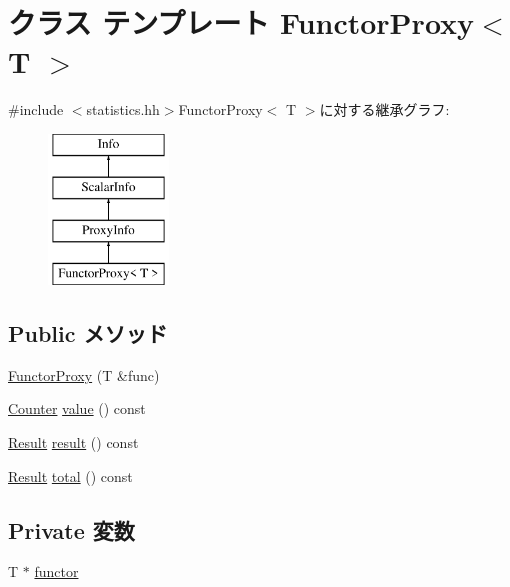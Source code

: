 \hypertarget{classStats_1_1FunctorProxy}{
\section{クラス テンプレート FunctorProxy$<$ T $>$}
\label{classStats_1_1FunctorProxy}
}


{\ttfamily \#include $<$statistics.hh$>$}FunctorProxy$<$ T $>$に対する継承グラフ:\begin{figure}[H]
\begin{center}
\leavevmode
\includegraphics[height=4cm]{classStats_1_1FunctorProxy}
\end{center}
\end{figure}
\subsection*{Public メソッド}
\begin{DoxyCompactItemize}
\item 
\hyperlink{classStats_1_1FunctorProxy_a97d355488c67286f64a92cf2cfacabc2}{FunctorProxy} (T \&func)
\item 
\hyperlink{namespaceStats_ac35128c026c72bb36af9cea00774e8a6}{Counter} \hyperlink{classStats_1_1FunctorProxy_aa9e486cb7eb0ad44f5f89923594b68a4}{value} () const 
\item 
\hyperlink{namespaceStats_ad874d2cfd4b4a29ebd480bb2e67f20ae}{Result} \hyperlink{classStats_1_1FunctorProxy_ae050da86c3d8e8a677a0bdeb7971e1e3}{result} () const 
\item 
\hyperlink{namespaceStats_ad874d2cfd4b4a29ebd480bb2e67f20ae}{Result} \hyperlink{classStats_1_1FunctorProxy_a35c6e2ed3fc81b40d69052a062113ead}{total} () const 
\end{DoxyCompactItemize}
\subsection*{Private 変数}
\begin{DoxyCompactItemize}
\item 
T $\ast$ \hyperlink{classStats_1_1FunctorProxy_ab920aaec834536b454099d92f08a5425}{functor}
\end{DoxyCompactItemize}
